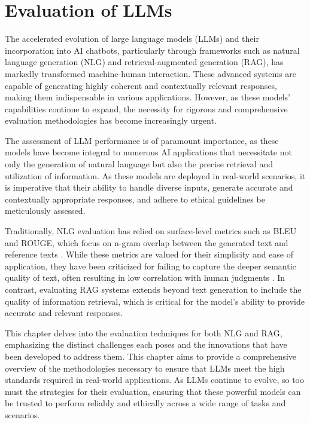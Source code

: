\section{Evaluation of LLMs}



The accelerated evolution of large language models (LLMs) and their incorporation into AI chatbots, particularly through frameworks such as natural language generation (NLG) and retrieval-augmented generation (RAG), has markedly transformed machine-human interaction. These advanced systems are capable of generating highly coherent and contextually relevant responses, making them indispensable in various applications. However, as these models' capabilities continue to expand, the necessity for rigorous and comprehensive evaluation methodologies has become increasingly urgent.

The assessment of LLM performance is of paramount importance, as these models have become integral to numerous AI applications that necessitate not only the generation of natural language but also the precise retrieval and utilization of information. As these models are deployed in real-world scenarios, it is imperative that their ability to handle diverse inputs, generate accurate and contextually appropriate responses, and adhere to ethical guidelines be meticulously assessed.

Traditionally, NLG evaluation has relied on surface-level metrics such as BLEU and ROUGE, which focus on n-gram overlap between the generated text and reference texts \cite{papineni2002bleu, lin2004rouge}. While these metrics are valued for their simplicity and ease of application, they have been criticized for failing to capture the deeper semantic quality of text, often resulting in low correlation with human judgments \cite{sulem2018bleu}. In contrast, evaluating RAG systems extends beyond text generation to include the quality of information retrieval, which is critical for the model's ability to provide accurate and relevant responses.

This chapter delves into the evaluation techniques for both NLG and RAG, emphasizing the distinct challenges each poses and the innovations that have been developed to address them. This chapter aims to provide a comprehensive overview of the methodologies necessary to ensure that LLMs meet the high standards required in real-world applications. As LLMs continue to evolve, so too must the strategies for their evaluation, ensuring that these powerful models can be trusted to perform reliably and ethically across a wide range of tasks and scenarios.


